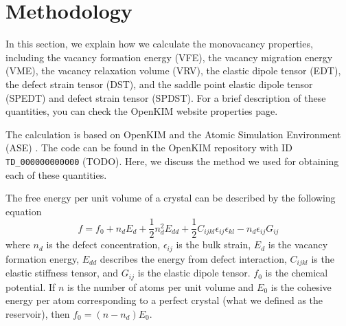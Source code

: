 \documentclass[%
 reprint,
 nofootinbib,
 amsmath,amssymb,
 aps,
]{revtex4-1}
\begin{document}
\section{\label{sec:method}Methodology}

In this section, we explain how we calculate the monovacancy properties, including the vacancy formation energy (VFE), the vacancy migration energy (VME), the vacancy relaxation volume (VRV), the elastic dipole tensor (EDT), the defect strain tensor (DST), and the saddle point elastic dipole tensor (SPEDT) and defect strain tensor (SPDST).
For a brief description of these quantities, you can check the OpenKIM website properties page.

The calculation is based on OpenKIM \cite{openkim2016} and the Atomic Simulation Environment (ASE) \cite{bahn2002object}.
The code can be found in the OpenKIM repository with ID \lstinline{TD_000000000000} (TODO).
Here, we discuss the method we used for obtaining each of these quantities.

The free energy per unit volume of a crystal can be described by the following equation \cite{freedman2009elastic}
\begin{equation}\label{eq:f}
f = f_0 + n_dE_d + \frac{1}{2}n_d^2E_{dd} + \frac{1}{2}C_{ijkl}\epsilon_{ij}\epsilon_{kl} - n_d\epsilon_{ij}G_{ij}
\end{equation}
where $n_d$ is the defect concentration, $\epsilon_{ij}$ is the bulk strain, $E_d$ is the vacancy formation energy, $E_{dd}$ describes the energy from defect interaction, $C_{ijkl}$ is the elastic stiffness tensor, and $G_{ij}$ is the elastic dipole tensor.
$f_0$ is the chemical potential. If $n$ is the number of atoms per unit volume and $E_0$ is the cohesive energy per atom corresponding to a perfect crystal (what we defined as the reservoir), then $f_0 = (n - n_d) E_{0}$.
\end{document}
